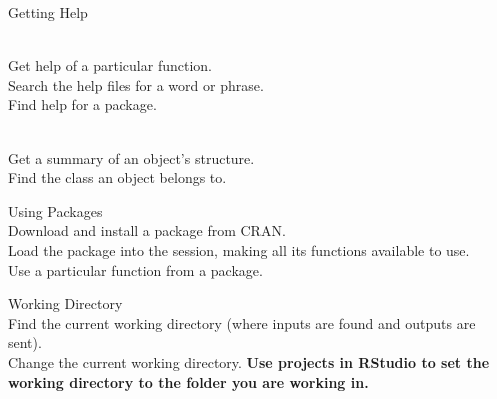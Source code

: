 
\begin{block}{Getting Help}
  
  \\Get help of a particular function.\br
  \\Search the help files for a word or phrase.\br
  \\Find help for a package.
  
  \\Get a summary of an object's structure.\br
  \\Find the class an object belongs to.
\end{block}

\begin{block}{Using Packages}
  \\Download and install a package from CRAN.\br
  \\Load the package into the session, making all its functions available to use.\br
  \\Use a particular function from a package.\br
\end{block}

\begin{block}{Working Directory}
  \\Find the current working directory (where inputs are found and outputs are sent).\br
  \\Change the current working directory.\br
  \textbf{Use projects in RStudio to set the working directory to the folder you are working in.}
\end{block}